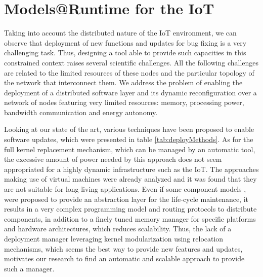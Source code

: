 \chapter{Models@Runtime for the IoT}
\label{ch:MARContiki}
Taking into account the distributed nature of the IoT environment, we can observe that deployment of new functions and updates for bug fixing is a very challenging task.
Thus, designing a tool able to provide such capacities in this constrained context raises several scientific challenges.
All the following challenges are related to the limited resources of these nodes and the particular topology of the network that interconnect them.
We address the problem of enabling the deployment of a distributed software layer and its dynamic reconfiguration over a network of nodes featuring very limited resources: memory, processing power, bandwidth communication and energy autonomy.

Looking at our state of the art, various techniques have been proposed to enable software updates, which were presented in table \ref{tab:deployMethods}.
As for the full kernel replacement mechanism, which can be managed by an automatic tool\cite{hui2004dynamic}, the excessive amount of power needed by this approach does not seem appropriated for a highly dynamic infrastructure such as the IoT.
The approaches making use of virtual machines were already analyzed and it was found that they are not suitable for long-living applications\cite{oliver2014reprogramming}.
Even if some component models \cite{mottola2008figaro}, \cite{taherkordi2013optimizing} were proposed to provide an abstraction layer for the life-cycle maintenance, it results in a very complex programming model and routing protocols to distribute components, in addition to a finely tuned memory manager for specific platforms and hardware architectures, which reduces scalability.
Thus, the lack of a deployment manager leveraging kernel modularization using relocation mechanisms, which seems the best way to provide new features and updates, motivates our research to find an automatic and scalable approach to provide such a manager.

